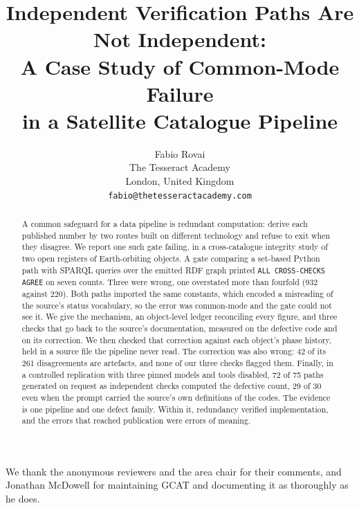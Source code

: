 \documentclass{article}
\title{Independent Verification Paths Are Not Independent:\\
       A Case Study of Common-Mode Failure\\ in a Satellite Catalogue Pipeline}
\author{Fabio Rovai\\
  The Tesseract Academy\\
  London, United Kingdom\\
  \texttt{fabio@thetesseractacademy.com}}
\begin{document}
\maketitle

\begin{abstract}
A common safeguard for a data pipeline is redundant computation: derive each
published number by two routes built on different technology and refuse to exit
when they disagree. We report one such gate failing, in a cross-catalogue
integrity study of two open registers of Earth-orbiting objects. A gate
comparing a set-based Python path with SPARQL queries over the emitted RDF graph
printed \texttt{ALL CROSS-CHECKS AGREE} on seven counts. Three were wrong, one
overstated more than fourfold (932 against 220). Both paths imported the same
constants, which encoded a misreading of the source's status vocabulary, so the
error was common-mode and the gate could not see it. We give the mechanism, an
object-level ledger reconciling every figure, and three checks that go back to
the source's documentation, measured on the defective code and on its
correction. We then checked that correction against each object's phase
history, held in a source file the pipeline never read. The correction was also wrong: 42 of its 261 disagreements are
artefacts, and none of our three checks flagged them. Finally, in a controlled
replication with three pinned models and tools disabled, 72 of 75 paths
generated on request as independent checks computed the defective count, 29 of
30 even when the prompt carried the source's own definitions of the codes. The evidence is one pipeline and one
defect family. Within it, redundancy verified implementation, and the errors
that reached publication were errors of meaning.
\end{abstract}











\begin{ack}
We thank the anonymous reviewers and the area chair for their comments, and
Jonathan McDowell for maintaining GCAT and documenting it as thoroughly as he does.
\end{ack}





\end{document}
